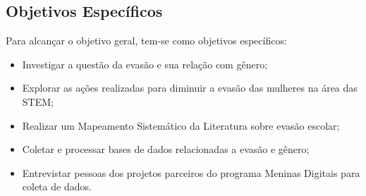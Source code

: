 \subsection{Objetivos Específicos}\label{sec:ObjEspecifico}
Para alcançar o objetivo geral, tem-se como objetivos específicos:
\begin{itemize}

\item Investigar a questão da evasão e sua relação com gênero;


\item Explorar as ações realizadas para diminuir a evasão das mulheres na área das STEM;


\item Realizar um Mapeamento Sistemático da Literatura sobre evasão escolar;

\item Coletar e processar bases de dados relacionadas a evasão e gênero;

\item Entrevistar pessoas dos projetos parceiros do programa Meninas Digitais para coleta de dados.








\end{itemize}
